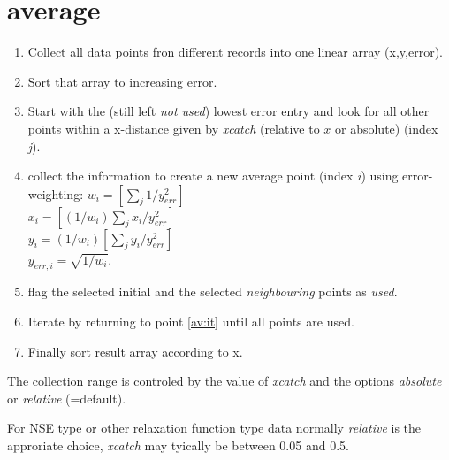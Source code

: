 \documentclass[12pt]{article}
\begin{document}
\setlength{\parskip}{0.3cm}

\section{average}
\label{sec:average}


\begin{enumerate}
\item Collect all data points fron different records into one linear array (x,y,error).
\item Sort that array to increasing error.
\item \label{av:it} Start with the (still left \emph{not used}) lowest error entry 
and look for all other points within 
a x-distance given by \emph{xcatch} (relative to ${x}$ or absolute) (index \emph{j}).
\item collect the information to create a new average point (index \emph{i}) using error-weighting:
${w_i=[ \sum_j {1/y_{err}^2}]}$ \\
${x_i=[(1/w_i) \sum_j {x_i/y_{err}^2}]}$ \\
${y_i=(1/w_i)[\sum_j {y_i/y_{err}^2}]}$ \\
${y_{err,i} = \sqrt{1/w_i}}$.
\item flag the selected initial and the selected \emph{neighbouring} points as \emph{used}.
\item Iterate by returning to point \ref{av:it} until all points are used.
\item Finally sort result array according to x.

\end{enumerate}

The collection range is controled by the value of \emph{xcatch} and the options
\emph{absolute} or \emph{relative} (=default).

For NSE type or other relaxation function type data normally \emph{relative} is the
approriate choice, \emph{xcatch} may tyically be between 0.05 and 0.5.
\end{document}
